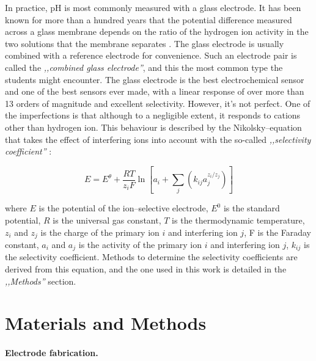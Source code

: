 \documentclass[manuscript=article, journal=jceda8]{achemso}
\begin{document}
In practice, pH is most commonly measured with a glass electrode.
It has been known for more than a hundred years that the potential difference measured across a glass membrane depends on the ratio of the hydrogen ion activity in the two solutions that the membrane separates \cite{haber1909elektrische, haber1909concerning}.
The glass electrode is usually combined with a reference electrode for convenience.
Such an electrode pair is called the \emph{,,combined glass electrode''}, and this the most common type the students might encounter.
The glass electrode is the best electrochemical sensor and one of the best sensors ever made, with a linear response of over more than 13 orders of magnitude and excellent selectivity.
However, it's not perfect. One of the imperfections is that although to a negligible extent, it responds to cations other than hydrogen ion.
This behaviour is described by the Nikolsky--equation that takes the effect of interfering ions into account with the so-called \emph{,,selectivity coefficient''} \cite{nicolsky1937theory}:

\begin{equation}
E=E^\theta + \frac{RT}{z_iF} \ln \left [ a_i + \sum_{j} \left ( k_{ij}a_j^{z_i/z_j} \right ) \right ]
\end{equation}

where $E$ is the potential of the ion--selective electrode, $E^0$ is the standard potential, $R$ is the universal gas constant, $T$ is the thermodynamic temperature, $z_i$ and $z_j$ is the charge of the primary ion $i$ and interfering ion $j$, F is the Faraday constant, $a_i$ and $a_j$ is the activity of the primary ion $i$ and interfering ion $j$, $k_{ij}$ is the selectivity coefficient. Methods to determine the selectivity coefficients are derived from this equation, and the one used in this work is detailed in the \emph{,,Methods''} section.


\section{Materials and Methods}
\paragraph{Electrode fabrication.}
\end{document}
